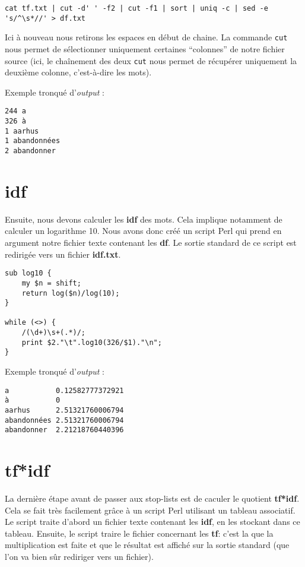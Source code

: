 \begin{lstlisting}
cat tf.txt | cut -d' ' -f2 | cut -f1 | sort | uniq -c | sed -e 's/^\s*//' > df.txt
\end{lstlisting}

Ici à nouveau nous retirons les espaces en début de chaine. La commande \lstinline{cut} nous permet de sélectionner uniquement certaines ``colonnes'' de notre fichier source (ici, le chaînement des deux \lstinline{cut} nous permet de récupérer uniquement la deuxième colonne, c'est-à-dire les mots).

\medskip
\noindent Exemple tronqué d'\textit{output} :
\begin{lstlisting}
244 a
326 à
1 aarhus
1 abandonnées
2 abandonner
\end{lstlisting}

\section{idf}

Ensuite, nous devons calculer les \textbf{idf} des mots. Cela implique notamment de calculer un logarithme 10. Nous avons donc créé un script Perl qui prend en argument notre fichier texte contenant les \textbf{df}. Le sortie standard de ce script est redirigée vers un fichier \textbf{idf.txt}.

\perl
\begin{lstlisting}
sub log10 {
    my $n = shift;
    return log($n)/log(10);
}

while (<>) {
    /(\d+)\s+(.*)/;
    print $2."\t".log10(326/$1)."\n";
}
\end{lstlisting}

\medskip

\noindent Exemple tronqué d'\textit{output} :
\begin{lstlisting}
a           0.12582777372921
à           0
aarhus      2.51321760006794
abandonnées 2.51321760006794
abandonner  2.21218760440396
\end{lstlisting}

\section{tf*idf}

La dernière étape avant de passer aux stop-lists est de caculer le quotient \textbf{tf*idf}. Cela se fait très facilement grâce à un script Perl utilisant un tableau associatif. Le script traite d'abord un fichier texte contenant les \textbf{idf}, en les stockant dans ce tableau. Ensuite, le script traire le fichier concernant les \textbf{tf}: c'est la que la multiplication est faite et que le résultat est affiché sur la sortie standard (que l'on va bien sûr rediriger vers un fichier).

